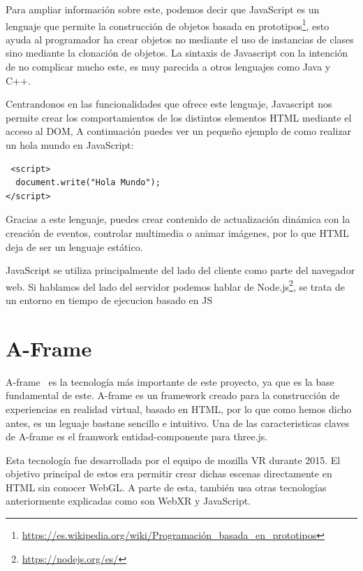 \documentclass[a4paper, 12pt]{book}
\begin{document}
Para ampliar información sobre este, podemos decir que JavaScript es un lenguaje que permite la construcción de objetos basada en prototipos\footnote{\url{https://es.wikipedia.org/wiki/Programación_basada_en_prototipos}}, esto ayuda al programador ha crear objetos no mediante el uso de  instancias de clases sino mediante la clonación de objetos. La sintaxis de Javascript con la intención de no complicar mucho este, es muy parecida a otros lenguajes como Java y C++.

Centrandonos en las funcionalidades que ofrece este lenguaje, Javascript nos permite crear los comportamientos de los distintos elementos  HTML mediante el acceso al DOM, A continuación puedes ver un pequeño ejemplo de como realizar un hola mundo en JavaScript:


\begin{verbatim}
 <script>
  document.write("Hola Mundo");
</script>   
\end{verbatim}

Gracias a este lenguaje, puedes crear contenido de actualización dinámica con la creación de eventos, controlar multimedia o animar imágenes, por lo que HTML deja de ser un lenguaje estático.

JavaScript se utiliza principalmente del lado del cliente como parte del navegador web. Si hablamos del lado del servidor podemos hablar de Node.js\footnote{\url{https://nodejs.org/es/}}, se trata de un entorno  en tiempo de ejecucion basado en JS



\section{A-Frame} %
\label{sec:A-Frame}

A-frame~\cite{a} es la tecnología más importante de este proyecto, ya que es la base fundamental de este. A-frame es un framework creado para la construcción de experiencias en realidad virtual, basado en HTML, por lo que como hemos dicho antes, es un leguaje bastane sencillo e intuitivo. Una de las caracteristicas claves de A-frame es el framwork entidad-componente para three.js.

Esta tecnología fue desarrollada por el equipo de mozilla VR durante 2015. El objetivo principal de estos era permitir crear dichas escenas directamente en HTML sin conocer WebGL. A parte de esta, también usa otras tecnologías anteriormente explicadas como son WebXR y JavaScript.
\end{document}
